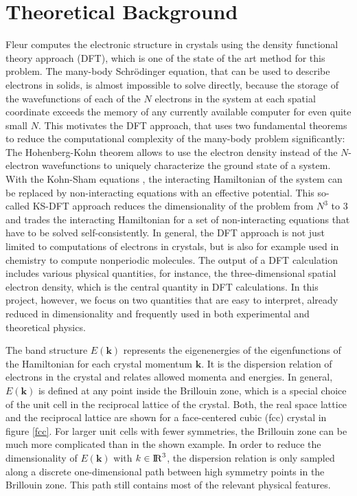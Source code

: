 
\chapter{Theoretical Background}
\label{chap:theory}



Fleur computes the electronic structure in crystals using the density functional theory approach (DFT), which is one of the state of the art method for this problem. The many-body Schrödinger equation, that can be used to describe electrons in solids, is almost impossible to solve directly, because the storage of the wavefunctions of each of the $N$ electrons in the system at each spatial coordinate exceeds the memory of any currently available computer for even quite small $N$. This motivates the DFT approach, that uses two fundamental theorems to reduce the computational complexity of the many-body problem significantly: The Hohenberg-Kohn theorem \cite{hohenberg-kohn} allows to use the electron density instead of the $N$-electron wavefunctions to uniquely characterize the ground state of a system. With the Kohn-Sham equations \cite{kohn-sham}, the interacting Hamiltonian of the system can be replaced by non-interacting equations with an effective potential. This so-called KS-DFT approach reduces the dimensionality of the problem from $N^3$ to $3$ and trades the interacting Hamiltonian for a set of non-interacting equations that have to be solved self-consistently. In general, the DFT approach is not just limited to computations of electrons in crystals, but is also for example used in chemistry to compute nonperiodic molecules.
% 
The output of a DFT calculation includes various physical quantities, for instance, the three-dimensional spatial electron density, which is the central quantity in DFT calculations. In this project, however, we focus on two quantities that are easy to interpret, already reduced in dimensionality and frequently used in both experimental and theoretical physics.

The band structure $E(\mathbf{k})$ represents the eigenenergies of the eigenfunctions of the Hamiltonian for each crystal momentum $\mathbf{k}$. It is the dispersion relation of electrons in the crystal and relates allowed momenta and energies. In general, $E(\mathbf{k})$ is defined at any point inside the Brillouin zone, which is a special choice of the unit cell in the reciprocal lattice of the crystal. Both, the real space lattice and the reciprocal lattice are shown for a face-centered cubic (fcc) crystal in figure \ref{fcc}. For larger unit cells with fewer symmetries, the Brillouin zone can be much more complicated than in the shown example. In order to reduce the dimensionality of $E(\mathbf{k})$ with $k \in {\rm I\!R}^3$, the dispersion relation is only sampled along a discrete one-dimensional path between high symmetry points in the Brillouin zone. This path still contains most of the relevant physical features.

